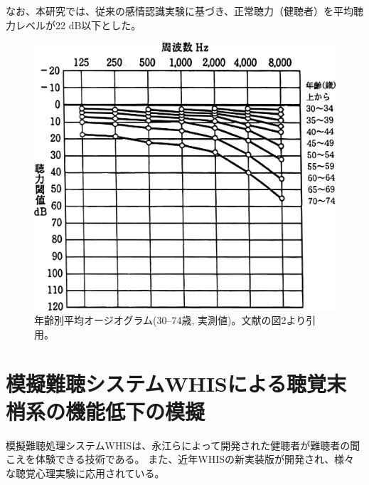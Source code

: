 なお、本研究では、従来の感情認識実験\cite{christensen2019effects}に基づき、正常聴力（健聴者）を平均聴力レベルが22 dB以下とした。
\begin{figure}[h]
    \centering
    \includegraphics[width=0.6\hsize]{Figure/RelatedResearch/Tsuiki2003Audiogram.eps}
    \caption{年齢別平均オージオグラム(30--74歳, 実測値)。文献\cite{tuiki2003eldery}の図2より引用。}
    \label{fig:Audiogram}
\end{figure}



\section{模擬難聴システムWHISによる聴覚末梢系の機能低下の模擬 \cite{irino2022moginancho,irino2023hearing}}
\label{sec:WHIS}

模擬難聴処理システムWHISは、永江らによって開発された健聴者が難聴者の聞こえを体験できる技術である\cite{nagae2016WHIS}。
また、近年WHISの新実装版が開発され\cite{irino2023hearing}、様々な聴覚心理実験に応用されている。


